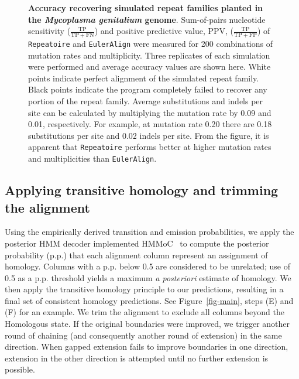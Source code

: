 \documentclass[9.5pt,journal,final,finalsubmission,twocolumn]{IEEEtran}
\begin{document}
\begin{figure*}[th!]
\centering {}
\caption[Accuracy recovering simulated repeat families planted in the
\textit{Mycoplasma genitalium} genome]%
{\textbf{Accuracy recovering simulated repeat families planted in the
\textit{Mycoplasma genitalium} genome}.  Sum-of-pairs nucleotide
sensitivity ($\frac{\mathrm{TP}}{\mathrm{TP} + \mathrm{FN}}$) and positive predictive value, PPV, ($\frac{\mathrm{TP}}{\mathrm{TP} +
\mathrm{FP}}$) of \texttt{Repeatoire}
and \texttt{EulerAlign} were measured for 200
combinations of mutation rates and multiplicity.  Three replicates of
each simulation were performed and average accuracy values are shown
here.  White points indicate perfect alignment of the simulated repeat
family.  Black points indicate the program completely failed to
recover any portion of the repeat family.  Average substitutions and indels per site can be
calculated by multiplying the mutation rate by 0.09 and 0.01, respectively.  For example, at mutation rate 0.20
there are 0.18 substitutions per site and 0.02 indels per site.  From
the figure, it is apparent that \texttt{Repeatoire} performs better
at higher mutation rates and multiplicities than \texttt{EulerAlign}.}
\label{fig-results}
\end{figure*}


\subsection{Applying transitive homology and trimming the alignment}
Using the empirically derived transition and emission probabilities,
we apply the posterior HMM decoder implemented HMMoC~\cite{Lunter2007} to compute the posterior probability (p.p.) that
each alignment column represent an assignment of homology.  Columns with a
p.p. below 0.5 are considered to be unrelated; use of 0.5 as a p.p. threshold
yields a maximum \textit{a posteriori} estimate of homology.  We then apply the
transitive homology principle to our predictions, resulting in a final
set of consistent homology predictions. See Figure~\ref{fig-main},
steps (E) and (F) for an example. We trim the alignment to exclude all
columns beyond the Homologous state. If the original boundaries were
improved, we trigger another round of chaining (and consequently
another round of extension) in the same direction.
When gapped extension fails to improve boundaries
in one direction, extension in the other direction is attempted until
no further extension is possible.
\end{document}
